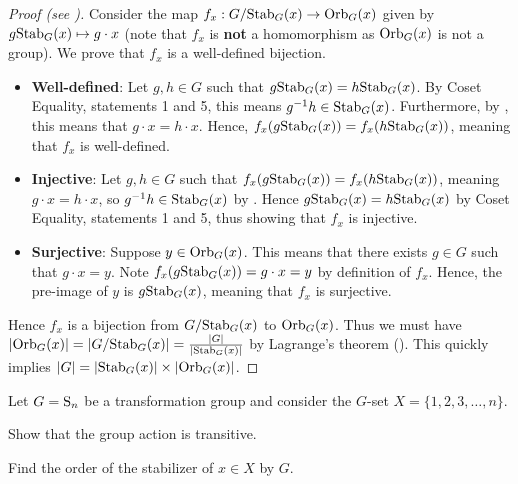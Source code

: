 \begin{proof}[Proof (see {\cite[Theorem 10.16]{humphreys_1996}})]
    Consider the map $f_x: G/\mathrm{Stab}_{G}(x) \to \mathrm{Orb}_{G}(x)$ given by $g\mathrm{Stab}_{G}(x) \mapsto g \cdot x$ (note that $f_x$ is \textbf{not} a homomorphism as $\mathrm{Orb}_{G}(x)$ is not a group). We prove that $f_x$ is a well-defined bijection.
    \begin{itemize}
        \item \textbf{Well-defined}: Let $g, h \in G$ such that $g\mathrm{Stab}_{G}(x) = h\mathrm{Stab}_{G}(x)$. By Coset Equality, statements 1 and 5, this means $g^{-1}h \in \mathrm{Stab}_{G}(x)$. Furthermore, by , this means that $g\cdot x = h\cdot x$. Hence, $f_x(g\mathrm{Stab}_{G}(x)) = f_x(h\mathrm{Stab}_{G}(x))$, meaning that $f_x$ is well-defined.

        \item \textbf{Injective}: Let $g, h \in G$ such that $f_x(g\mathrm{Stab}_{G}(x)) = f_x(h\mathrm{Stab}_{G}(x))$, meaning $g\cdot x = h\cdot x$, so $g^{-1}h \in \mathrm{Stab}_{G}(x)$ by . Hence $g\mathrm{Stab}_{G}(x) = h\mathrm{Stab}_{G}(x)$ by Coset Equality, statements 1 and 5, thus showing that $f_x$ is injective.

        \item \textbf{Surjective}: Suppose $y \in \mathrm{Orb}_{G}(x)$. This means that there exists $g \in G$ such that $g\cdot x = y$. Note $f_x(g\mathrm{Stab}_{G}(x)) = g\cdot x = y$ by definition of $f_x$. Hence, the pre-image of $y$ is $g\mathrm{Stab}_{G}(x)$, meaning that $f_x$ is surjective.
    \end{itemize}
    Hence $f_x$ is a bijection from $G/\mathrm{Stab}_{G}(x)$ to $\mathrm{Orb}_{G}(x)$. Thus we must have $|\mathrm{Orb}_{G}(x)| = |G/\mathrm{Stab}_{G}(x)| = \frac{|G|}{|\mathrm{Stab}_{G}(x)|}$ by Lagrange's theorem (). This quickly implies $|G| = |\mathrm{Stab}_{G}(x)|\times|\mathrm{Orb}_{G}(x)|$.
\end{proof}

\begin{exercise}
    Let $G = \mathrm{S}_{n}$ be a transformation group and consider the $G$-set $X = \{1, 2, 3, \dots, n\}$.
    \begin{partquestions}{\roman*}
        \item Show that the group action is transitive.
        \item Find the order of the stabilizer of $x \in X$ by $G$.
    \end{partquestions}
\end{exercise}

